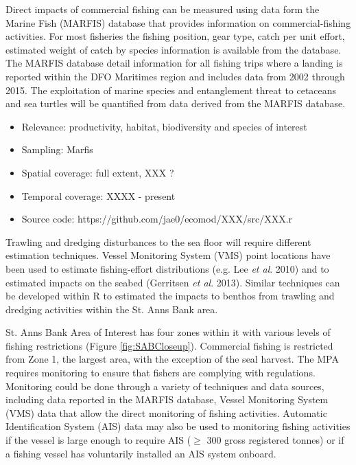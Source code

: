\documentclass[letterpaper,portrait,11pt]{scrartcl}
\numberwithin{equation}{section}		%
\numberwithin{figure}{section}		%
\numberwithin{table}{section}				%
\begin{document}
Direct impacts of commercial fishing can be measured using data form the Marine Fish (MARFIS) database that provides information on commercial-fishing activities.  For most fisheries the fishing position, gear type, catch per unit effort, estimated weight of catch by species information is available from the database. The MARFIS database detail information for all fishing trips where a landing is reported within the DFO Maritimes region and includes data from 2002 through 2015.    The exploitation of marine species and entanglement threat to cetaceans and sea turtles will be quantified from data derived from the MARFIS database.
   
\begin{itemize}
  \item Relevance:  productivity, habitat, biodiversity and species of interest
  \item Sampling:  Marfis
  \item Spatial coverage: full extent, XXX ?
  \item Temporal coverage: XXXX - present
  \item Source code: https://github.com/jae0/ecomod/XXX/src/XXX.r
\end{itemize}	

Trawling and dredging disturbances to the sea floor will require different estimation techniques.  Vessel Monitoring System (VMS) point locations have been used to estimate fishing-effort distributions (e.g. Lee \textit{et al}. 2010) and to estimated impacts on the seabed (Gerritsen \textit{et al}. 2013).  Similar techniques can be developed within R to estimated the impacts to benthos from trawling and dredging activities within the St. Anns Bank area.   


St. Anns Bank Area of Interest has four zones within it with various levels of fishing restrictions (Figure \ref{fig:SABCloseup}). Commercial fishing is restricted from Zone 1, the largest area, with the exception of the seal harvest.  The MPA requires monitoring to ensure that fishers are complying with regulations.  Monitoring could be done through a variety of techniques and data sources, including data reported in the MARFIS database, Vessel Monitoring System (VMS) data that allow the direct monitoring of fishing activities. Automatic Identification System (AIS) data may also be used to monitoring fishing activities if the vessel is large enough to require AIS ($\geq$ 300 gross registered tonnes) or if a fishing vessel has voluntarily installed an AIS system onboard.  
\end{document}

